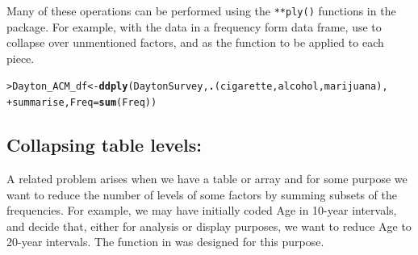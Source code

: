 \documentclass[10pt,krantz2]{krantz}\usepackage[]{graphicx}\usepackage[]{color}
\makeatletter
\newcommand{\hlstd}[1]{\textcolor[rgb]{0.345,0.345,0.345}{#1}}%
\newcommand{\hlkwb}[1]{\textcolor[rgb]{0.69,0.353,0.396}{#1}}%
\newcommand{\hlkwc}[1]{\textcolor[rgb]{0.333,0.667,0.333}{#1}}%
\newcommand{\hlkwd}[1]{\textcolor[rgb]{0.737,0.353,0.396}{\textbf{#1}}}%
\newenvironment{kframe}{%
 \def\at@end@of@kframe{}%
 \ifinner\ifhmode%
  \def\at@end@of@kframe{\end{minipage}}%
  \begin{minipage}{\columnwidth}%
 \fi\fi%
 \def\FrameCommand##1{\hskip\@totalleftmargin \hskip-\fboxsep
 \colorbox{shadecolor}{##1}\hskip-\fboxsep
     \hskip-\linewidth \hskip-\@totalleftmargin \hskip\columnwidth}%
 \MakeFramed {\advance\hsize-\width
   \@totalleftmargin\z@ \linewidth\hsize
   \@setminipage}}%
 {\par\unskip\endMakeFramed%
 \at@end@of@kframe}
\newenvironment{knitrout}{}{} %
\renewenvironment{knitrout}{\small\renewcommand{\baselinestretch}{.85}}{} %
\makeatother
\begin{document}

Many of these operations can be performed using the \verb|**ply()| functions
in the  package.
For example, with the data in a frequency form data frame, use 
to collapse over unmentioned factors, and %
as the function to be applied to each piece.
\begin{knitrout}
\color{fgcolor}\begin{kframe}
\begin{alltt}
\hlstd{> }\hlstd{Dayton_ACM_df} \hlkwb{<-} \hlkwd{ddply}\hlstd{(DaytonSurvey,} \hlkwd{.}\hlstd{(cigarette, alcohol, marijuana),}
\hlstd{+ }                       \hlstd{summarise,} \hlkwc{Freq} \hlstd{=} \hlkwd{sum}\hlstd{(Freq))}
\end{alltt}
\end{kframe}
\end{knitrout}

\subsection[Collapsing table levels]{Collapsing table levels: }\label{sec:collapse-levels}

A related problem arises when we have a table or array and for some purpose
we want to reduce the number of levels of some factors by summing subsets
of the frequencies.  For example, we may have initially coded Age in 10-year
intervals, and decide that, either for analysis or display purposes, we
want to reduce Age to 20-year intervals.  The  function
in  was designed for this purpose.
\end{document}
